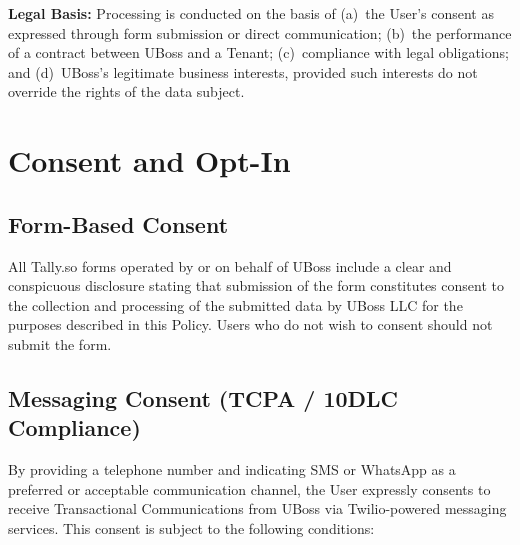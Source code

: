 \documentclass[11pt, letterpaper]{article}
\begin{document}
\textbf{Legal Basis:} Processing is conducted on the basis of (a)~the User's consent
as expressed through form submission or direct communication; (b)~the performance of a
contract between UBoss and a Tenant; (c)~compliance with legal obligations; and
(d)~UBoss's legitimate business interests, provided such interests do not override the
rights of the data subject.



\section{Consent and Opt-In}

\subsection{Form-Based Consent}

All Tally.so forms operated by or on behalf of UBoss include a clear and conspicuous
disclosure stating that submission of the form constitutes consent to the collection
and processing of the submitted data by UBoss LLC for the purposes described in this
Policy. Users who do not wish to consent should not submit the form.

\subsection{Messaging Consent (TCPA / 10DLC Compliance)}
\label{subsec:messaging-consent}

By providing a telephone number and indicating SMS or WhatsApp as a preferred or
acceptable communication channel, the User expressly consents to receive Transactional
Communications from UBoss via Twilio-powered messaging services. This consent is
subject to the following conditions:
\end{document}
